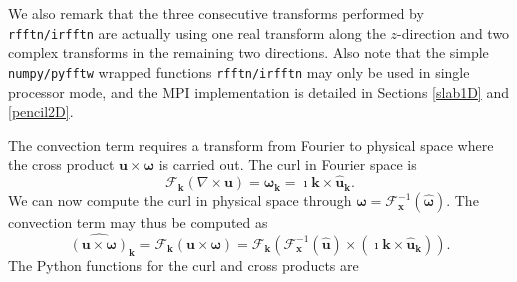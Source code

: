 \documentclass[11pt, oneside]{article}
\newcommand{\inpyth}{\lstinline[style=pythonstyle, basicstyle=\ttfamily]} %[]%
\begin{document}
We also remark that the three consecutive transforms performed by \inpyth{rfftn/irfftn} are actually using one real transform along the $z$-direction and two complex transforms in the remaining two directions. Also note that the simple \texttt{numpy/pyfftw} wrapped functions \inpyth{rfftn/irfftn} may only be used in single processor mode, and the MPI implementation is detailed in Sections
\ref{slab1D} and \ref{pencil2D}.

The convection term requires a transform from Fourier to physical space where the cross product $\bm{u} \times \bm{\omega}$ is carried out. The curl in Fourier space is
\begin{equation}
\mathcal{F}_{\bm{k}}(\nabla \times \bm{u}) = \hat{\bm{\omega}}_{\bm{k}} = \imath \bm{k} \times \hat{\bm{u}}_{\bm{k}}.
\end{equation}
We can now compute the curl in physical space through $\bm{\omega} = \mathcal{F}_{\bm{x}}^{-1}(\hat{\bm{\omega}})$. The convection term may thus be computed as
\begin{equation}
\widehat{( \bm{u} \times \bm{\omega})}_{\bm{k}} = \mathcal{F}_{\bm{k}}(\bm{u} \times \bm{\omega}) = \mathcal{F}_{\bm{k}} (\mathcal{F}^{-1}_{\bm{x}}(\hat{\bm{u}}) \times (\imath \bm{k} \times \hat{\bm{u}}_{\bm{k}})).
\label{eq:curl_convection}
\end{equation}
The Python functions for the curl and cross products are
\end{document}
